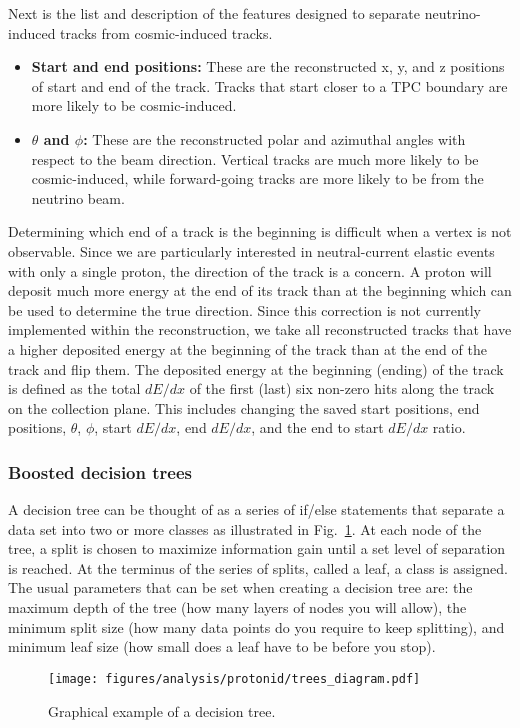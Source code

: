     Next is the list and description of the features designed to separate
    neutrino-induced tracks from cosmic-induced tracks.
    \begin{itemize}
      \item \textbf{Start and end positions:} These are the reconstructed x, y,
      and z positions of start and end of the track. Tracks that start closer
      to a TPC boundary are more likely to be cosmic-induced.
      \item \textbf{$\theta$ and $\phi$:} These are the reconstructed polar and
      azimuthal angles with respect to the beam direction. Vertical tracks are
      much more likely to be cosmic-induced, while forward-going tracks are
      more likely to be from the neutrino beam.
    \end{itemize}
   
    Determining which end of a track is the beginning is difficult when a
    vertex is not observable. Since we are particularly interested in
    neutral-current elastic events with only a single proton, the direction of
    the track is a concern. A proton will deposit much more energy at the end
    of its track than at the beginning which can be used to determine the true
    direction. Since this correction is not currently implemented within the
    reconstruction, we take all reconstructed tracks that have a higher
    deposited energy at the beginning of the track than at the end of the track
    and flip them. The deposited energy at the beginning (ending) of the track
    is defined as the total $dE/dx$ of the first (last) six non-zero hits along
    the track on the collection plane.  This includes changing the saved start
    positions, end positions, $\theta$, $\phi$, start $dE/dx$, end $dE/dx$, and
    the end to start $dE/dx$ ratio.
    
  \subsubsection{Boosted decision trees}\label{sec:decisiontrees}
    A decision tree can be thought of as a series of if/else statements that
    separate a data set into two or more classes as illustrated in
    Fig.~\ref{fig:dtree}. At each node of the tree, a split is chosen to
    maximize information gain until a set level of separation is reached.  At
    the terminus of the series of splits, called a leaf, a class is assigned.
    The usual parameters that can be set when creating a decision tree are: the
    maximum depth of the tree (how many layers of nodes you will allow), the
    minimum split size (how many data points do you require to keep splitting),
    and minimum leaf size (how small does a leaf have to be before you stop). 
    \begin{figure}[ht]
      \centering
      \texttt{[image: figures/analysis/protonid/trees\_diagram.pdf]}
      \caption{Graphical example of a decision tree.}
      \label{fig:dtree}
    \end{figure}
    
